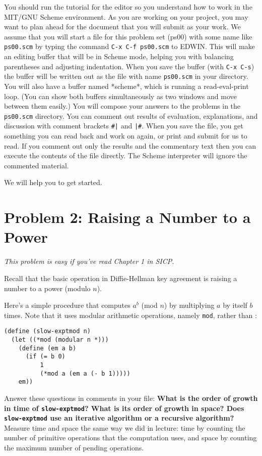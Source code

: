You should run the tutorial for the editor so you understand how to
work in the MIT/GNU Scheme environment.  As you are working on your
project, you may want to plan ahead for the document that you will
submit as your work.  We assume that you will start a file for this
problem set (ps00) with some name like {\tt ps00.scm} by typing the
command {\tt C-x~C-f~ps00.scm} to EDWIN.  This will make an editing
buffer that will be in Scheme mode, helping you with balancing
parentheses and adjusting indentation.  When you save the buffer (with
{\tt C-x~C-s}) the buffer will be written out as the file with name
{\tt ps00.scm} in your directory.  You will also have a buffer named
*scheme*, which is running a read-eval-print loop.  (You can show both
buffers simultaneously as two windows and move between them easily.)
You will compose your answers to the problems in the {\tt ps00.scm}
directory.  You can comment out results of evaluation, explanations,
and discussion with comment brackets {\tt \#|} and {\tt |\#}.
When you save the file, you get something you can read back and work
on again, or print and submit for us to read.  If you comment out only
the results and the commentary text then you can execute the contents
of the file directly.  The Scheme interpreter will ignore the
commented material.

We will help you to get started.


\section*{Problem 2: Raising a Number to a Power}

{\it This problem is easy if you've read Chapter 1 in SICP.}
 
Recall that the basic operation in Diffie-Hellman key agreement is
raising a number to a power (modulo $n$).

Here's a simple procedure that computes $a^b$ (mod $n$) by multiplying
$a$ by itself $b$ times.  Note that it uses modular arithmetic
operations, namely {\tt *mod}, rather than {\tt *}:

\begin{verbatim}
(define (slow-exptmod n)
  (let ((*mod (modular n *)))
    (define (em a b)
      (if (= b 0)
          1
          (*mod a (em a (- b 1)))))
    em))
\end{verbatim}

Answer these questions in comments in your file: {\bf What is the
  order of growth in time of {\tt slow-exptmod}?  What is its order of
  growth in space?  Does {\tt slow-exptmod} use an iterative algorithm
  or a recursive algorithm?}  Measure time and space the same way we
did in lecture: time by counting the number of primitive operations
that the computation uses, and space by counting the maximum number of
pending operations.

